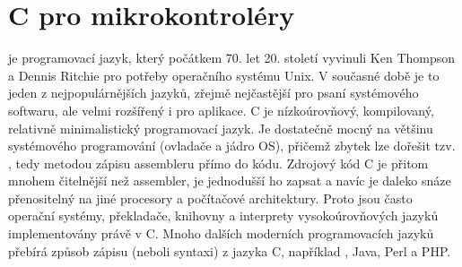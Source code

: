 
\chapter{C pro mikrokontroléry}
\minitoc
  \wikiANSIC je programovací jazyk, který počátkem 70. let 20. století vyvinuli Ken Thompson a 
  Dennis Ritchie pro potřeby operačního systému Unix. V současné době je to jeden z 
  nejpopulárnějších jazyků, zřejmě nejčastější pro psaní systémového softwaru, ale velmi rozšířený 
  i pro aplikace. C je nízkoúrovňový, kompilovaný, relativně minimalistický programovací jazyk. Je 
  dostatečně mocný na většinu systémového programování (ovladače a jádro OS), přičemž zbytek lze 
  dořešit tzv. \wikiInlineASM, tedy metodou zápisu assembleru přímo do kódu. Zdrojový kód C je 
  přitom mnohem čitelnější než assembler, je jednodušší ho zapsat a navíc je daleko snáze 
  přenositelný na jiné procesory a počítačové architektury. Proto jsou často operační systémy, 
  překladače, knihovny a interprety vysokoúrovňových jazyků implementovány právě v C. Mnoho dalších 
  moderních programovacích jazyků přebírá způsob zápisu (neboli syntaxi) z jazyka C, například 
  \wikiCPP, Java, Perl a PHP.

